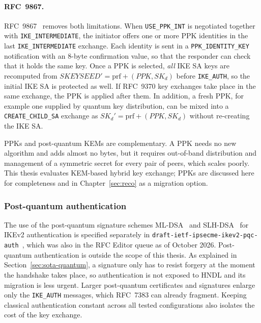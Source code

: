 \paragraph{RFC~9867.}
RFC~9867~\cite{rfc9867} removes both limitations. When \texttt{USE\_PPK\_INT}
is negotiated together with \texttt{IKE\_INTERMEDIATE}, the initiator offers
one or more PPK identities in the last \texttt{IKE\_INTERMEDIATE} exchange.
Each identity is sent in a \texttt{PPK\_IDENTITY\_KEY} notification with an
8-byte confirmation value, so that the responder can check that it holds the
same key. Once a PPK is selected, \emph{all} IKE SA keys are recomputed from
$\mathit{SKEYSEED}' = \mathrm{prf+}(\mathit{PPK}, SK_d)$ before
\texttt{IKE\_AUTH}, so the initial IKE SA is protected as well. If RFC~9370
key exchanges take place in the same exchange, the PPK is applied after them.
In addition, a fresh PPK, for example one supplied by quantum key distribution,
can be mixed into a \texttt{CREATE\_CHILD\_SA} exchange as
$SK_d' = \mathrm{prf+}(\mathit{PPK}, SK_d)$ without re-creating the IKE SA.

PPKs and post-quantum KEMs are complementary. A PPK needs no new algorithm and
adds almost no bytes, but it requires out-of-band distribution and management
of a symmetric secret for every pair of peers, which scales poorly.
This thesis evaluates KEM-based hybrid key exchange; PPKs are discussed here
for completeness and in Chapter~\ref{sec:reco} as a migration option.

\subsubsection{Post-quantum authentication}
\label{sec:sota-pqauth}

The use of the post-quantum signature schemes ML-DSA~\cite{fips204} and
SLH-DSA~\cite{fips205} for IKEv2 authentication is specified separately in
\texttt{draft-ietf-ipsecme-ikev2-pqc-auth}~\cite{ikev2pqcauth}, which was also
in the RFC Editor queue as of October 2026. Post-quantum authentication is
outside the scope of this thesis. As explained in
Section~\ref{sec:sota-quantum}, a signature only has to resist forgery at the
moment the handshake takes place, so authentication is not exposed to HNDL
and its migration is less urgent. Larger post-quantum certificates and
signatures enlarge only the \texttt{IKE\_AUTH} messages, which RFC~7383 can
already fragment. Keeping classical authentication constant across all tested
configurations also isolates the cost of the key exchange.

